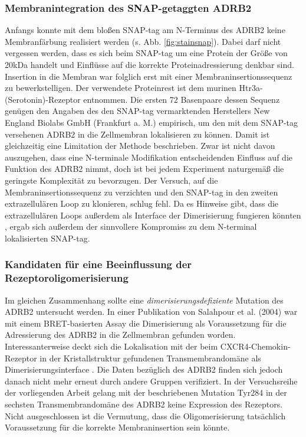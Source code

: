 \subsubsection{Membranintegration des SNAP-getaggten ADRB2}
Anfangs konnte mit dem bloßen SNAP-tag am N-Terminus des ADRB2 keine Membranfärbung realisiert werden (s. Abb. \ref{fig:stainsnap}). Dabei darf nicht vergessen werden, dass es sich beim SNAP-tag um eine Protein der Größe von 20\si{\kilo Da} handelt und Einflüsse auf die korrekte Proteinadressierung denkbar sind. Insertion in die Membran war folglich erst mit einer Membraninsertionssequenz zu bewerkstelligen. Der verwendete Proteinrest ist dem murinen Htr3a-(Serotonin)-Rezeptor entnommen. Die ersten 72 Basenpaare dessen Sequenz genügen den Angaben des den SNAP-tag vermarktenden Herstellers New England Biolabs GmbH (Frankfurt a. M.) empirisch, um den mit dem SNAP-tag versehenen ADRB2 in die Zellmembran lokalisieren zu können. Damit ist gleichzeitig eine Limitation der Methode beschrieben. Zwar ist nicht davon auszugehen, dass eine N-terminale Modifikation entscheidenden Einfluss auf die Funktion des ADRB2 nimmt, doch ist bei jedem Experiment naturgemäß die geringste Komplexität zu bevorzugen. Der Versuch, auf die Membraninsertionssequenz zu verzichten und den SNAP-tag in den zweiten extrazellulären Loop zu klonieren, schlug fehl. Da es Hinweise gibt, dass die extrazellulären Loops außerdem als Interface der Dimerisierung fungieren könnten \parencite{Salahpour2004}, ergab sich außerdem der sinnvollere Kompromiss zu dem N-terminal lokalisierten SNAP-tag.

\subsubsection{Kandidaten für eine Beeinflussung der Rezeptoroligomerisierung}
Im gleichen Zusammenhang sollte eine \textit{dimerisierungsdefiziente} Mutation des ADRB2 untersucht werden. In einer Publikation von Salahpour et al. (2004) war mit einem BRET-basierten Assay die Dimerisierung als Voraussetzung für die Adressierung des ADRB2 in die Zellmembran gefunden worden. Interessanterweise deckt sich die Lokalisation mit der beim CXCR4-Chemokin-Rezeptor in der Kristallstruktur gefundenen Transmembrandomäne als Dimerisierungsinterface \parencite{Wu2010}. Die Daten bezüglich des ADRB2 finden sich jedoch danach nicht mehr erneut durch andere Gruppen verifiziert. In der Versuchsreihe der vorliegenden Arbeit gelang mit der beschriebenen Mutation Tyr284 in der sechsten Transmembrandomäne des ADRB2 keine Expression des Rezeptors. Nicht ausgeschlossen ist die Vermutung, dass die Oligomerisierung tatsächlich Voraussetzung für die korrekte Membraninsertion sein könnte.

